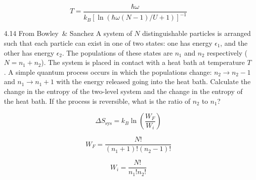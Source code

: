 \begin{equation}
T = \frac{\hbar\omega}{k_B \left[ \ln \left( \hbar\omega(N - 1)/U + 1 \right) \right]^{-1}}
\end{equation}


\begin{eocproblem*}{4.14 From Bowley \& Sanchez}
{A system of \(N\) distinguishable particles is arranged such that each particle can exist in one of two states: one has energy \(\epsilon_1\), and the other has energy \(\epsilon_2\). The populations of these states are \(n_1\) and \(n_2\) respectively (\(N = n_1 + n_2\)). The system is placed in contact with a heat bath at temperature \(T\). A simple quantum process occurs in which the populations change: \(n_2 \rightarrow n_2 - 1\) and \(n_1 \rightarrow n_1 + 1\) with the energy released going into the heat bath. Calculate the change in the entropy of the two-level system and the change in the entropy of the heat bath. If the process is reversible, what is the ratio of \(n_2\) to \(n_1\)?}
\end{eocproblem*}

\begin{equation}
\Delta S_\mathrm{sys} = k_B \ln \left( \frac{W_F}{W_i} \right)
\end{equation}

\begin{equation}
W_F = \frac{N!}{(n_1 + 1)! (n_2 - 1)!}
\end{equation}

\begin{equation}
W_i = \frac{N!}{n_1! n_2!}
\end{equation}

